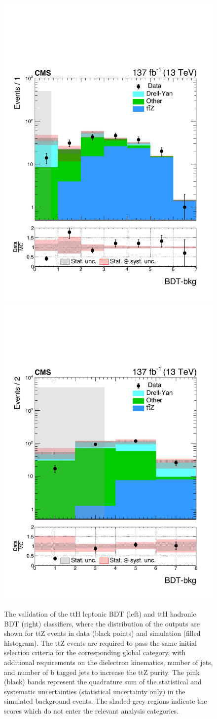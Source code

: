 \begin{figure}
  \centering
  \includegraphics[width=.49\textwidth]{Figures/hgg_overview/ttHLeptonic_MVA_ttZ.pdf}
  \includegraphics[width=.49\textwidth]{Figures/hgg_overview/ttHHadronic_MVA_ttZ.pdf}
  \caption[Validation of the top-associated classifiers]
  {
    The validation of the ttH leptonic BDT (left) and ttH hadronic BDT (right) classifiers, where the distribution of the outputs are shown for ttZ events in data (black points) and simulation (filled histogram). The ttZ events are required to pass the same initial selection criteria for the corresponding global category, with additional requirements on the dielectron kinematics, number of jets, and number of b tagged jets to increase the ttZ purity. The pink (black) bands represent the quadrature sum of the statistical and systematic uncertainties (statistical uncertainty only) in the simulated background events. The shaded-grey regions indicate the scores which do not enter the relevant analysis categories.
  }
  \label{fig:top_validation}
\end{figure}

